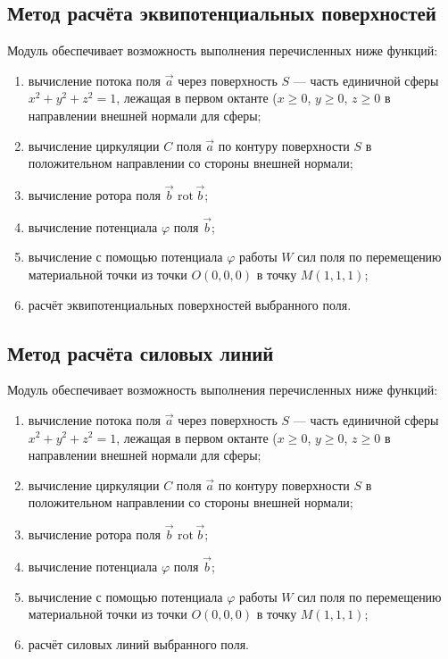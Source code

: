 \documentclass[14pt,a4paper,final]{extreport}
\begin{document}
\subsection{Метод расчёта эквипотенциальных поверхностей}

Модуль обеспечивает возможность выполнения перечисленных ниже функций:
\begin{enumerate}[label=\asbuk*),ref=\asbuk*]
	\item вычисление потока поля \( \vec a \) через поверхность \( S \) --- часть единичной сферы \(x^2 + y^2 + z^2 = 1 \), лежащая в первом октанте (\( x \geq 0 \), \( y \geq 0 \), \( z \geq 0 \) в направлении внешней нормали для сферы;
	
	\item вычисление циркуляции \( C \) поля \( \vec a \) по контуру поверхности \( S \) в положительном направлении со стороны внешней нормали;
	
	\item вычисление ротора поля \( \vec b \) \( \mathrm{rot}\, \vec b \);
	
	\item вычисление потенциала \( \varphi \) поля \( \vec b \);
	
	\item вычисление с помощью потенциала \( \varphi \) работы \( W \) сил поля по перемещению материальной точки из точки \(O(0,0,0) \) в точку \( M(1,1,1) \);
	
	\item расчёт эквипотенциальных поверхностей выбранного поля.
\end{enumerate}

\subsection{Метод расчёта силовых линий}
Модуль обеспечивает возможность выполнения перечисленных ниже функций:
\begin{enumerate}[label=\asbuk*),ref=\asbuk*]
	\item вычисление потока поля \( \vec a \) через поверхность \( S \) --- часть единичной сферы \(x^2 + y^2 + z^2 = 1 \), лежащая в первом октанте (\( x \geq 0 \), \( y \geq 0 \), \( z \geq 0 \) в направлении внешней нормали для сферы;
	
	\item вычисление циркуляции \( C \) поля \( \vec a \) по контуру поверхности \( S \) в положительном направлении со стороны внешней нормали;
	
	\item вычисление ротора поля \( \vec b \) \( \mathrm{rot}\, \vec b \);
	
	\item вычисление потенциала \( \varphi \) поля \( \vec b \);
	
	\item вычисление с помощью потенциала \( \varphi \) работы \( W \) сил поля по перемещению материальной точки из точки \(O(0,0,0) \) в точку \( M(1,1,1) \);
	
	\item расчёт силовых линий выбранного поля.
\end{enumerate}
\end{document}
